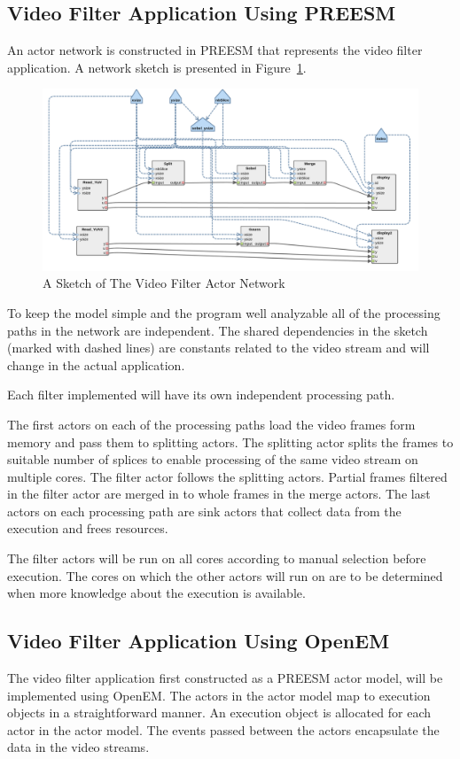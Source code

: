 \subsection{Video Filter Application Using PREESM}
An actor network is constructed in PREESM that represents the video filter application. A network sketch is presented in Figure~\ref{sketch}.
\begin{figure}[h!]
\begin{center}
\includegraphics[width=1.3\textwidth,natwidth=2250,natheight=1090]{preesm_gauss.png}
\caption{A Sketch of The Video Filter Actor Network}\label{sketch}
\end{center}
\end{figure}
To keep the model simple and the program well analyzable all of the processing paths in the network are independent. The shared dependencies in the sketch (marked with dashed lines) are constants related to the video stream and will change in the actual application.

Each filter implemented will have its own independent processing path.

The first actors on each of the processing paths load the video frames form memory and pass them to splitting actors. The splitting actor splits the frames to suitable number of splices to enable processing of the same video stream on multiple cores. The filter actor follows the splitting actors. Partial frames filtered in the filter actor are merged in to whole frames in the merge actors. The last actors on each processing path are sink actors that collect data from the execution and frees resources.

The filter actors will be run on all cores according to manual selection before execution. The cores on which the other actors will run on are to be determined when more knowledge about the execution is available.

\subsection{Video Filter Application Using OpenEM}
The video filter application first constructed as a PREESM actor model, will be implemented using OpenEM. The actors in the actor model map to execution objects in a straightforward manner. An execution object is allocated for each actor in the actor model. The events passed between the actors encapsulate the data in the video streams.

